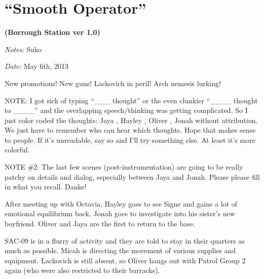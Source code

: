 \setcounter{chapter}{ 19 }
\chapter{\textbf{``Smooth Operator''} }




\begin{center}
 {\LARGE \textbf{(Borrough Station ver 1.0)} } 
\end{center}




\textit{Notes:} Suko

\textit{Date:} May 6th, 2013



New promotions!  New guns!  Lackovich in peril!  Arch nemesis lurking!



NOTE: I got sick of typing ``\_\_\_ thought'' or the even clunkier ``\_\_\_\_ thought to \_\_\_\_'' and the overlapping speech/thinking was getting complicated.  So I just color coded the thoughts:  {\color[RGB]{204,0,0}Jaya} ,  {\color[RGB]{230,145,56}Hayley} ,  {\color[RGB]{106,168,79}Oliver} ,  {\color[RGB]{60,120,216}Jonah}  without attribution.  We just have to remember who can hear which thoughts.  Hope that makes sense to people.  If it's unreadable, say so and I'll try something else.  At least it's more colorful.



NOTE \#2: The last few scenes (post-instrumentation) are going to be really patchy on details and dialog, especially between Jaya and Jonah.  Please please fill in what you recall.  Danke!



\noindent\hrulefill





After meeting up with Octavia, Hayley goes to see Signe and gains a lot of emotional equilibrium back.  Jonah goes to investigate into his sister's new boyfriend.  Oliver and Jaya are the first to return to the base.



SAC-09 is in a flurry of activity and they are told to stay in their quarters as much as possible.  Micah is directing the movement of various supplies and equipment.  Lackovich is still absent, so Oliver hangs out with Patrol Group 2 again (who were also restricted to their barracks).



